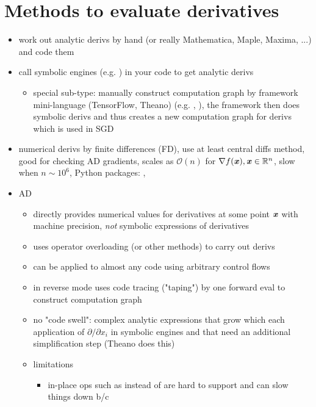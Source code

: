 \documentclass[paper=a4,11pt,headsepline]{scrartcl}
\begin{document}
\section{Methods to evaluate derivatives}

\begin{itemize}
    \item work out analytic derivs by hand (or really Mathematica, Maple, Maxima, ...)
        and code them
    \item call symbolic engines (e.g. ) in your code to get
        analytic derivs
    \begin{itemize}
        \item special sub-type: manually construct computation graph by
            framework mini-language (TensorFlow, Theano) (e.g. ,
            ), the framework then does symbolic derivs and thus
            creates a new computation graph for derivs which is used in SGD
    \end{itemize}
\item numerical derivs by finite differences (FD), use at least central diffs method,
    good for checking AD gradients, scales as $\mathcal
    O(n)$ for $\nabla f(\bm{\mathit{x}}), \bm{\mathit{x}}\in\mathbb R^n$, slow when $n\sim 10^6$,
    Python packages: \numdifftools, \scipy
\item AD
    \begin{itemize}
        \item directly provides numerical values for derivatives at some point
            $\bm{\mathit{x}}$ with machine precision, \emph{not} symbolic expressions of
            derivatives
        \item uses operator overloading (or other methods) to carry out derivs
        \item can be applied to almost any code using arbitrary control flows
        \item in reverse mode uses code tracing ("taping") by one forward eval
            to construct computation graph
        \item no "code swell": complex analytic expressions that grow which each
            application of $\partial/\partial x_i$ in symbolic engines and that
            need an additional simplification step (Theano does this)
        \item limitations
        \begin{itemize}
            \item in-place ops such as  instead of
                 are hard to support and can slow things down b/c

\end{itemize}
\end{itemize}
\end{itemize}
\end{document}
